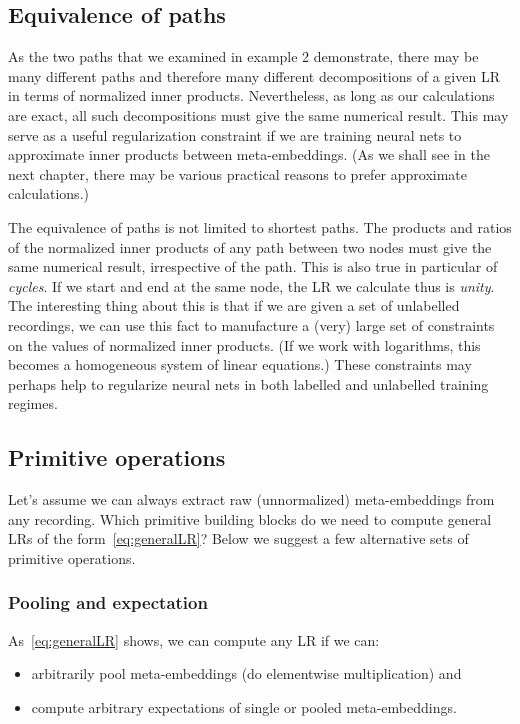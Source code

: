 \documentclass[a4paper,oneside,12pt,english]{report}
\begin{document}
\subsection{Equivalence of paths}
As the two paths that we examined in example 2 demonstrate, there may be many different paths and therefore many different decompositions of a given LR in terms of normalized inner products. Nevertheless, as long as our calculations are exact, all such decompositions must give the same numerical result. This may serve as a useful regularization constraint if we are training neural nets to approximate inner products between meta-embeddings. (As we shall see in the next chapter, there may be various practical reasons to prefer approximate calculations.) 

The equivalence of paths is not limited to shortest paths. The products and ratios of the normalized inner products of any path between two nodes must give the same numerical result, irrespective of the path. This is also true in particular of \emph{cycles}. If we start and end at the same node, the LR we calculate thus is \emph{unity}. The interesting thing about this is that if we are given a set of unlabelled recordings, we can use this fact to manufacture a (very) large set of constraints on the values of normalized inner products. (If we work with logarithms, this becomes a homogeneous system of linear equations.) These constraints may perhaps help to regularize neural nets in both labelled and unlabelled training regimes.      

\subsection{Primitive operations}
Let's assume we can always extract raw (unnormalized) meta-embeddings from any recording. Which primitive building blocks do we need to compute general LRs of the form~\eqref{eq:generalLR}? Below we suggest a few alternative sets of primitive operations. 

\subsubsection{Pooling and expectation}
As~\eqref{eq:generalLR} shows, we can compute any LR if we can:
\begin{itemize}
	\item arbitrarily pool meta-embeddings (do elementwise multiplication) and
	\item compute arbitrary expectations of single or pooled meta-embeddings.
\end{itemize}
\end{document}
